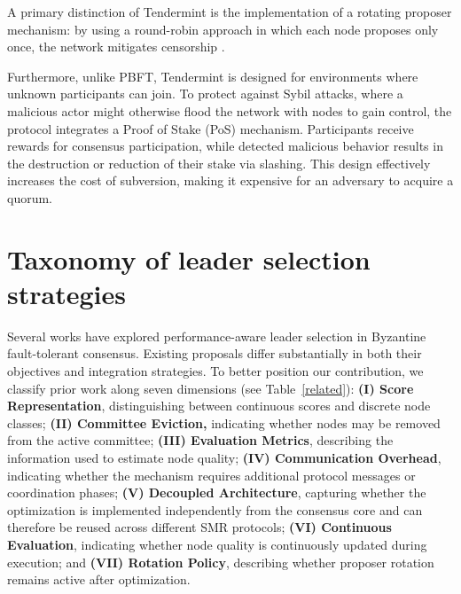 A primary distinction of Tendermint is the implementation of a rotating proposer mechanism: by using a round-robin approach in which each node proposes only once, the network mitigates censorship \cite{wahrstatter2024blockchain}. %

Furthermore, unlike PBFT, Tendermint is designed for environments where unknown participants can join. To protect against Sybil attacks\cite{douceur2002sybil}, where a malicious actor might otherwise flood the network with nodes to gain control, the protocol integrates a Proof of Stake (PoS) mechanism. %
Participants receive rewards for consensus participation, while detected malicious behavior results in the destruction or reduction of their stake via slashing. This design effectively increases the cost of subversion, making it expensive for an adversary to acquire a quorum.

\section{Taxonomy of leader selection strategies}
\label{sec:taxonomy}

Several works have explored performance-aware leader selection in Byzantine fault-tolerant consensus.
Existing proposals differ substantially in both their objectives and integration strategies. 
To better position our contribution, we classify prior work along seven dimensions (see Table~\ref{related}): 
\textbf{(I) Score Representation}, distinguishing between continuous scores and discrete node classes; 
\textbf{(II) Committee Eviction,} indicating whether nodes may be removed from the active committee; 
\textbf{(III) Evaluation Metrics}, describing the information used to estimate node quality; 
\textbf{(IV) Communication Overhead}, indicating whether the mechanism requires additional protocol messages or coordination phases; 
\textbf{(V) Decoupled Architecture}, capturing whether the optimization is implemented independently from the consensus core and can therefore be reused across different SMR protocols; 
\textbf{(VI) Continuous Evaluation}, indicating whether node quality is continuously updated during execution; and 
\textbf{(VII) Rotation Policy}, describing whether proposer rotation remains active after optimization.

